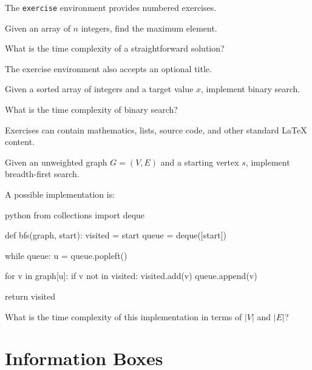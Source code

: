 \documentclass{csdept}
\begin{document}
The \texttt{exercise} environment provides numbered exercises.

\begin{exercise}

Given an array of $n$ integers, find the maximum element.

What is the time complexity of a straightforward solution?

\end{exercise}

The exercise environment also accepts an optional title.

\begin{exercise}

Given a sorted array of integers and a target value $x$,
implement binary search.

What is the time complexity of binary search?

\end{exercise}

Exercises can contain mathematics, lists, source code,
and other standard LaTeX content.

\begin{exercise}

Given an unweighted graph $G=(V,E)$ and a starting vertex $s$,
implement breadth-first search.

A possible implementation is:

\begin{code}{python}
from collections import deque

def bfs(graph, start):
    visited = {start}
    queue = deque([start])

    while queue:
        u = queue.popleft()

        for v in graph[u]:
            if v not in visited:
                visited.add(v)
                queue.append(v)

    return visited
\end{code}

What is the time complexity of this implementation in terms of
$|V|$ and $|E|$?

\end{exercise}

\newpage
\section{Information Boxes}
\end{document}

